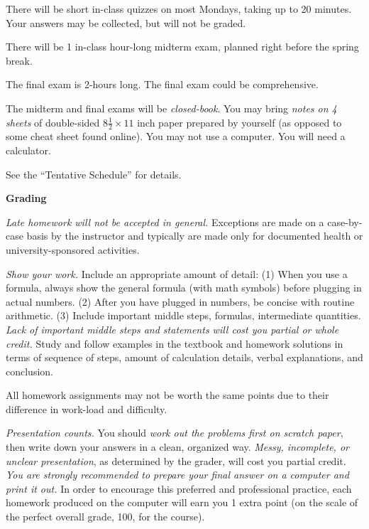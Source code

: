 \documentclass{article}
\begin{document}
There will be short in-class quizzes on most Mondays, taking up to 20
minutes. Your answers may be collected, but will not be graded.

There will be 1 in-class hour-long midterm exam, planned right before
the spring break.

The final exam is 2-hours long.
The final exam could be comprehensive.

The midterm and final exams will be \emph{closed-book}.
You may bring \emph{notes on 4 sheets} of double-sided
$8 \frac{1}{2} \times 11$ inch paper prepared by yourself
(as opposed to some cheat sheet found online).
You may not use a computer.
You will need a calculator.

See the ``Tentative Schedule'' for details.

\bigskip
\textbf{\large Grading}

\emph{Late homework will not be accepted in general.}
Exceptions are made on a case-by-case basis by the instructor
and typically are made only for
documented health or university-sponsored activities.

\emph{Show your work.} Include an appropriate amount of detail:
(1) When you use a formula, always show the general formula (with
    math symbols) before plugging in actual numbers.
(2) After you have plugged in numbers, be concise with routine arithmetic.
(3) Include important middle steps, formulas, intermediate quantities.
\emph{Lack of important middle steps and statements
will cost you partial or whole credit.}
Study and follow examples in the textbook and homework solutions
in terms of sequence of steps,
amount of calculation details,
verbal explanations, and conclusion.

All homework assignments may not be worth the same points due to their
difference in work-load and difficulty.

\emph{Presentation counts.}
You should \emph{work out the problems first on scratch paper},
then write down your answers in a clean, organized way.
\emph{Messy, incomplete, or unclear presentation},
as determined by the grader, will cost you partial credit.
\emph{You are strongly recommended to prepare your final answer on a computer and print it
out.}
In order to encourage this preferred and professional practice,
each homework produced on the computer will earn you 1 extra point
(on the scale of the perfect overall grade, 100, for the course).
\end{document}
